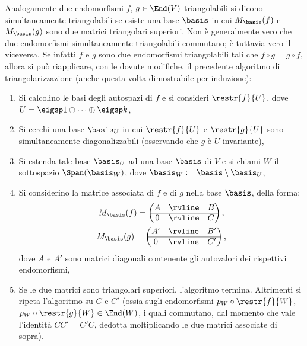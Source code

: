 \documentclass[10pt,landscape]{article}
\begin{document}
\begin{multicols}{3}
		Analogamente due endomorfismi $f$, $g \in \End(V)$ triangolabili si dicono
		simultaneamente triangolabili se esiste una base $\basis$
		in cui $M_\basis(f)$ e $M_\basis(g)$ sono due matrici
		triangolari superiori. Non è generalmente vero che
		due endomorfismi simultaneamente triangolabili
		commutano; è tuttavia vero il viceversa. Se infatti $f$
		e $g$ sono due endomorfismi triangolabili tali che $f \circ g = g \circ f$, allora si può riapplicare, con le dovute modifiche, il precedente algoritmo di triangolarizzazione (anche questa volta dimostrabile per induzione):
		\begin{enumerate}
			\itemsep 0pt
			\item Si calcolino le basi degli autospazi di $f$ e si consideri $\restr{f}{U}$, dove $U = \eigsp 1 \oplus \cdots \oplus \eigsp k$,
			\item Si cerchi una base $\basis_U$ in cui $\restr{f}{U}$ e $\restr{g}{U}$ sono simultaneamente diagonalizzabili (osservando che $g$ è $U$-invariante),
			\item Si estenda tale base $\basis_U$ ad una base $\basis$ di $V$ e si chiami $W$ il sottospazio $\Span(\basis_W)$, dove $\basis_W := \basis \setminus \basis_U$,
			\item Si considerino la matrice associata di $f$ e di $g$  nella base $\basis$, della forma: \setlength{\extrarowheight}{1.3pt}
			\begin{gather*}
				M_\basis(f) = \begin{pmatrix}
					A
					& \rvline & B \\
					\hline
					0 & \rvline &
					C
				\end{pmatrix}, \\
				M_\basis(g) = \begin{pmatrix}
					A'
					& \rvline & B' \\
					\hline
					0 & \rvline &
					C'
				\end{pmatrix},
			\end{gather*}
			\setlength{\extrarowheight}{0pt}dove $A$ e $A'$ sono matrici diagonali contenente gli autovalori dei rispettivi endomorfismi,
			\item Se le due matrici sono triangolari superiori, l'algoritmo termina. Altrimenti si ripeta l'algoritmo su $C$ e $C'$ (ossia sugli endomorfismi $p_W \circ \restr{f}{W}$, $p_W \circ \restr{g}{W} \in \End(W)$, i
			quali commutano, dal momento che vale l'identità $C C' = C' C$, dedotta moltiplicando le due matrici associate di sopra).
		\end{enumerate}
	

\end{multicols}
\end{document}
